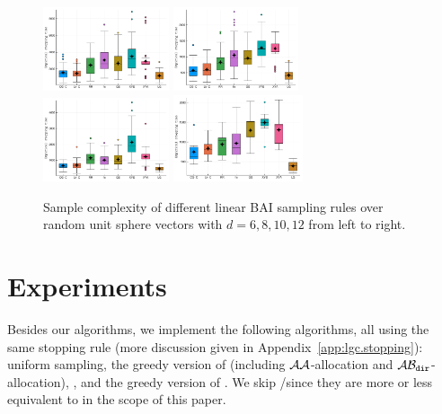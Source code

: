 \begin{figure}[t!]
 \centering
 \includegraphics[clip, width= 0.33\textwidth]{Chapter4/img/bai_dim_6}
 \includegraphics[clip, width= 0.33\textwidth]{Chapter4/img/bai_dim_8}
 \includegraphics[clip, width= 0.33\textwidth]{Chapter4/img/bai_dim_10}
 \includegraphics[clip, width= 0.34\textwidth]{Chapter4/img/bai_dim_12}
 \caption{Sample complexity of different linear BAI sampling rules over random unit sphere vectors with $d=6, 8, 10, 12$ from left to right.}
 \label{fig:sample_complexity_2}
\end{figure}

\section{Experiments}\label{sec:lgc.experiments}
Besides our algorithms, we implement the following algorithms, all using the same stopping rule (more discussion given in Appendix~\ref{app:lgc.stopping}): uniform sampling, the greedy version of \XYS (including $\mathcal{A}\mathcal{A}$-allocation and $\mathcal{A}\mathcal{B}_{\texttt{dir}}$-allocation), \XYA, and the greedy version of \LGapE. We skip \GLUCB/\GLGapE since they are more or less equivalent to \LGapE in the scope of this paper.
\vspace{-0.3cm}
